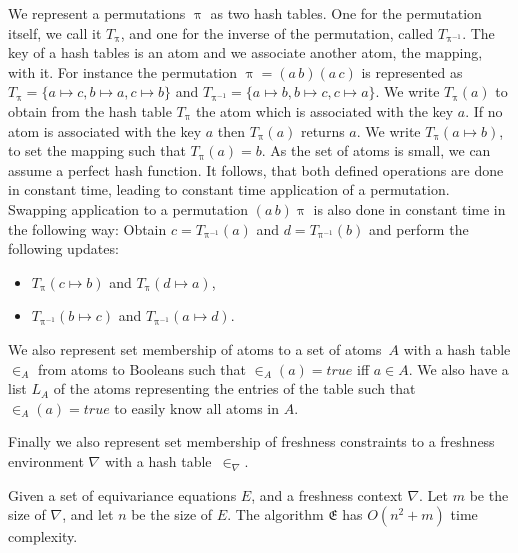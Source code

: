 \documentclass{llncs}
\newcommand{\swap}[2]{\ensuremath{(#1\, #2)}}
\newcommand\ppi{\uppi}
\newcommand{\msys}{\mathfrak{E}}
\newcommand{\mnabla}{\nabla}
\begin{document}
We represent a permutations $\ppi$ as two hash tables. One for the
permutation itself, we call it $T_\ppi$, and one for the inverse of
the permutation, called $T_{\ppi^{-1}}$. The key of a hash tables is
an atom and we associate another atom, the mapping, with it. For
instance the permutation $\ppi = \swap{a}{b}\swap{a}{c}$ is
represented as $T_\ppi=\{a\mapsto c, b\mapsto a, c\mapsto b\}$ and
$T_{\ppi^{-1}}=\{a\mapsto b, b\mapsto c, c\mapsto a\}$.  We write
$T_\ppi(a)$ to obtain from the hash table $T_\ppi$ the atom which is
associated with the key $a$. If no atom is associated with the key $a$
then $T_\ppi(a)$ returns $a$. We write $T_\ppi(a\mapsto b)$, to set
the mapping such that $T_\ppi(a) = b$.  As the set of atoms is small,
we can assume a perfect hash function. It follows, that both defined
operations are done in constant time, leading to constant time
application of a permutation. Swapping application to a permutation
$\swap{a}{b}\ppi$ is also done in constant time in the following way:
Obtain $c=T_{\ppi^{-1}}(a)$ and $d=T_{\ppi^{-1}}(b)$ and perform the
following updates:
\begin{itemize}
\item[(a)]
			$T_\ppi(c\mapsto b)$ and
			$T_\ppi(d\mapsto a)$,
\item[(b)]
			$T_{\ppi^{-1}}(b\mapsto c)$ and
			$T_{\ppi^{-1}}(a\mapsto d)$.
\end{itemize}

We also represent set membership of atoms to a set of atoms~$A$ with a
hash table $\in_A$ from atoms to Booleans such that $\in_A(a)=true$
iff $a\in A$. We also have a list $L_A$ of the atoms representing the
entries of the table such that $\in_A(a)=true$ to easily know all
atoms in $A$.

Finally we also represent set membership of freshness constraints to a freshness environment $\nabla$ with a hash table~$\in_\nabla$. 
\begin{theorem}\label{thm:match:complexity}
 Given a set of equivariance equations $E$, and a freshness context $\mnabla$.
Let $m$ be the size of $\mnabla$, and let $n$ be the size of $E$. The algorithm $\msys$ has $O(n^2 + m)$ time complexity.
\end{theorem}
\end{document}
